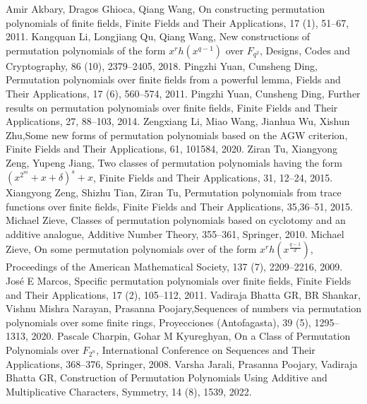 \documentclass[12pt,a4paper]{article}
\begin{document}
\begin{thebibliography}{}

Amir Akbary,  Dragos Ghioca,  Qiang Wang, {{On constructing permutation polynomials of finite fields}}, Finite Fields and Their Applications, 17 (1), 51--67, 2011.
 Kangquan Li, Longjiang Qu,  Qiang Wang, {{New constructions of permutation polynomials of the form $ x^{r}h(x^{q-1}) $ over $ F_{q^{2}} $}}, Designs, Codes and Cryptography, 86 (10), 2379--2405, 2018.
 Pingzhi Yuan,   Cunsheng Ding,	{{Permutation polynomials over finite fields from a powerful lemma}}, Fields and Their Applications, 17 (6), 560--574, 2011.
Pingzhi Yuan,   Cunsheng Ding, {{Further results on permutation polynomials over finite fields}}, Finite Fields and Their Applications,
27, 88--103, 2014.
 Zengxiang Li,  Miao Wang,  Jianhua Wu,  Xishun	Zhu,{{Some new forms of permutation polynomials based on the AGW criterion}}, Finite Fields and Their Applications, 61,
101584, 2020.
Ziran Tu,  Xiangyong Zeng,  Yupeng Jiang, {{Two classes of permutation polynomials having the form $(x^{2^{m}}+x+\delta)^{s}+x$}},
Finite Fields and Their Applications, 31, 12--24, 2015.
 Xiangyong Zeng, Shizhu Tian,  Ziran Tu,	{{Permutation polynomials from trace functions over finite fields}}, Finite Fields and Their Applications, 35,36--51, 2015.
Michael Zieve, {{Classes of permutation polynomials based on cyclotomy and an additive analogue}}, Additive Number Theory, 355--361,  Springer,
2010.
Michael Zieve, {{On some permutation polynomials over of the form $x^{r}h(x^{\frac{q-1}{d}})$}},
Proceedings of the American Mathematical Society, 137 (7), 2209--2216, 2009.
 Jos{\'e} E Marcos, {{Specific permutation polynomials over finite fields}}, Finite Fields and Their Applications, 17 (2), 105--112, 2011.
 Vadiraja Bhatta GR,  BR Shankar,  Vishnu Mishra  Narayan,  Prasanna  Poojary,{Sequences of numbers via permutation polynomials over some finite rings},
  Proyecciones (Antofagasta), 39 (5), 1295--1313, 2020.
 Pascale Charpin, Gohar M Kyureghyan, {{On a Class of Permutation Polynomials over  $F_{2^{n}} $}}, International Conference on Sequences and Their Applications, 368--376, Springer, 2008.
Varsha Jarali,  Prasanna Poojary,  Vadiraja Bhatta GR, {Construction of Permutation Polynomials Using Additive and Multiplicative Characters}, Symmetry, 14 (8), 1539, 2022.

\end{thebibliography}
\end{document}
